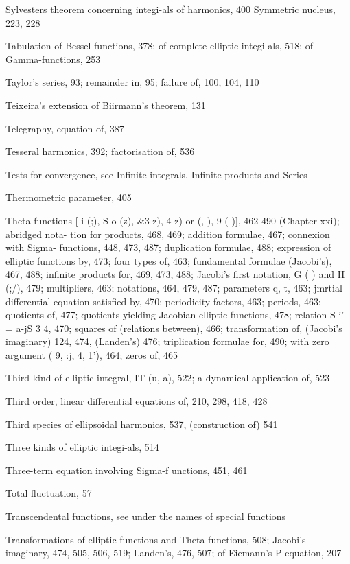 Sylvesters theorem concerning integi-als of harmonics, 400
Symmetric nucleus, 223, 228

Tabulation of Bessel functions, 378; of complete elliptic integi-als, 518; of Gamma-functions, 253

Taylor's series, 93; remainder in, 95; failure of, 100, 104, 110

Teixeira's extension of Biirmann's theorem, 131

Telegraphy, equation of, 387

Tesseral harmonics, 392; factorisation of, 536

Tests for convergence, see Infinite integrals, Infinite products and Series

Thermometric parameter, 405

Theta-functions [ i (;), S-o (z), \&3  z),  4  z) or   (,-), 9 ( )], 462-490 (Chapter xxi); abridged nota-
tion for products, 468, 469; addition formulae, 467; connexion with Sigma- functions, 448,
473, 487; duplication formulae, 488; expression of elliptic functions by, 473; four types
of, 463; fundamental formulae (Jacobi's), 467, 488; infinite products for, 469, 473, 488;
Jacobi's first notation, G ( ) and H (;/), 479; multipliers, 463; notations, 464, 479, 487;
parameters q, t, 463; jmrtial differential equation satisfied by, 470; periodicity factors,
463; periods, 463; quotients of, 477; quotients yielding Jacobian elliptic functions, 478;
relation S-i' = a-jS 3  4, 470; squares of (relations between), 466; transformation of, (Jacobi's
imaginary) 124, 474, (Landen's) 476; triplication formulae for, 490; with zero argument
( 9,  :j,  4,  1'), 464; zeros of, 465

Third kind of elliptic integral, IT (u, a), 522; a dynamical application of, 523

Third order, linear differential equations of, 210, 298, 418, 428

Third species of ellipsoidal harmonics, 537, (construction of) 541

Three kinds of elliptic integi-als, 514

Three-term equation involving Sigma-f unctions, 451, 461

Total fluctuation, 57

Transcendental functions, see under the names of special functions

Transformations of elliptic functions and Theta-functions, 508; Jacobi's imaginary, 474, 505,
506, 519; Landen's, 476, 507; of Eiemann's P-equation, 207

